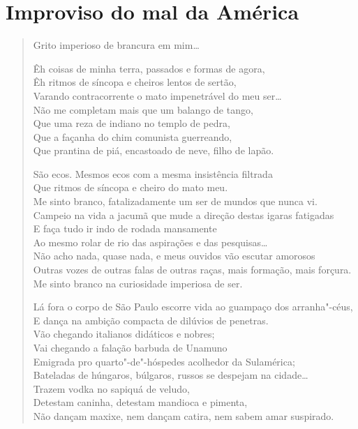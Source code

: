 \chapter[Improviso do mal da América]{Improviso do mal da América }




\begin{verse}
Grito imperioso de brancura em mim\ldots{}

Êh coisas de minha terra, passados e formas de agora,\\
Êh ritmos de síncopa e cheiros lentos de sertão,\\
Varando contracorrente o mato impenetrável do meu ser\ldots{}\\
Não me completam mais que um balango de tango,\\
Que uma reza de indiano no templo de pedra,\\
Que a façanha do chim comunista guerreando,\\
Que prantina de piá, encastoado de neve, filho de lapão.

São ecos. Mesmos ecos com a mesma insistência filtrada\\
Que ritmos de síncopa e cheiro do mato meu.\\
Me sinto branco, fatalizadamente um ser de mundos que nunca vi.\\
Campeio na vida a jacumã que mude a direção destas igaras fatigadas\\
E faça tudo ir indo de rodada mansamente\\
Ao mesmo rolar de rio das aspirações e das pesquisas\ldots{}\\
Não acho nada, quase nada, e meus ouvidos vão escutar amorosos\\
Outras vozes de outras falas de outras raças, mais formação, mais forçura.\\
Me sinto branco na curiosidade imperiosa de ser.

Lá fora o corpo de São Paulo escorre vida ao guampaço dos arranha"-céus,\\
E dança na ambição compacta de dilúvios de penetras.\\
Vão chegando italianos didáticos e nobres;\\
Vai chegando a falação barbuda de Unamuno\\
Emigrada pro quarto"-de"-hóspedes acolhedor da Sulamérica;\\
Bateladas de húngaros, búlgaros, russos se despejam na cidade\ldots{}\\
Trazem vodka no sapiquá de veludo,\\
Detestam caninha, detestam mandioca e pimenta,\\
Não dançam maxixe, nem dançam catira, nem sabem amar suspirado.


\end{verse}
